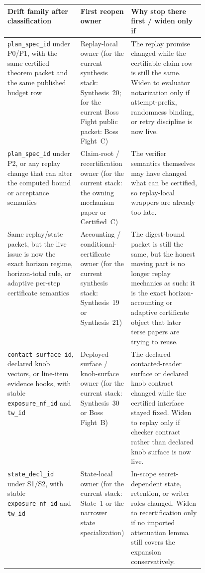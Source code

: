 \documentclass[11pt]{article}
\begin{document}
\begin{table}[t]
\centering
\small
\begin{tabularx}{\linewidth}{@{}>{\raggedright\arraybackslash}p{0.22\linewidth} >{\raggedright\arraybackslash}p{0.24\linewidth} X@{}}
\toprule
Drift family after classification & First reopen owner & Why stop there first / widen only if \\
\midrule
\texttt{plan\_spec\_id} under P0/P1, with the same certified theorem packet and the same published budget row & Replay-local owner (for the current synthesis stack: Synthesis~20; for the current Boss Fight public packet: Boss Fight~C) & The replay promise changed while the certifiable claim row is still the same. Widen to evaluator notarization only if attempt-prefix, randomness binding, or retry discipline is now live. \\
\texttt{plan\_spec\_id} under P2, or any replay change that can alter the computed bound or acceptance semantics & Claim-root / recertification owner (for the current stack: the owning mechanism paper or Certified~C) & The verifier semantics themselves may have changed what can be certified, so replay-local wrappers are already too late. \\
Same replay/state packet, but the live issue is now the exact horizon regime, horizon-total rule, or adaptive per-step certificate semantics & Accounting / conditional-certificate owner (for the current synthesis stack: Synthesis~19 or Synthesis~21) & The digest-bound packet is still the same, but the honest moving part is no longer replay mechanics as such: it is the exact horizon-accounting or adaptive certificate object that later terse papers are trying to reuse. \\
\texttt{contact\_surface\_id}, declared knob vectors, or line-item evidence hooks, with stable \texttt{exposure\_nf\_id} and \texttt{tw\_id} & Deployed-surface / knob-surface owner (for the current stack: Synthesis~30 or Boss Fight~B) & The declared contacted-reader surface or declared knob contract changed while the certified interface stayed fixed. Widen to replay only if checker contract rather than declared knob surface is now live. \\
\texttt{state\_decl\_id} under S1/S2, with stable \texttt{exposure\_nf\_id} and \texttt{tw\_id} & State-local owner (for the current stack: State~1 or the narrower state specialization) & In-scope secret-dependent state, retention, or writer roles changed. Widen to recertification only if no imported attenuation lemma still covers the expansion conservatively. \\

\end{tabularx}
\end{table}
\end{document}
